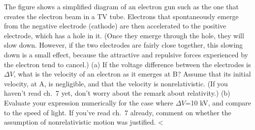         The figure shows a simplified diagram of an electron
        gun such as the 
        one that creates the electron beam in a TV tube. Electrons
        that spontaneously emerge from the negative electrode
        (cathode) are then accelerated to the positive electrode,
        which has a hole in it. (Once they emerge through the hole,
        they will slow down. However, if the two electrodes are
        fairly close together, this slowing down is a small effect,
        because the attractive and repulsive forces experienced by
        the electron tend to cancel.) \hwendpart
        (a) If the voltage difference
        between the electrodes is $\Delta V$, what is the velocity
        of an electron as it emerges at B? Assume that its initial
        velocity, at A, is negligible, and that the velocity is nonrelativistic. 
        (If you haven't read ch.~7 yet, don't worry about the remark about
        relativity.)
        \answercheck\hwendpart
        (b) Evaluate your
        expression numerically for the case where $\Delta V$=10 kV,
        and compare to the speed of light. If you've read ch.~7 already,
        comment on whether the assumption
        of nonrelativistic motion was justified.
        <%
